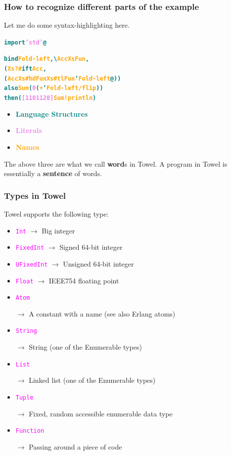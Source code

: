 \documentclass[10pt, compress, handout]{beamer}
\newcommand{\sst}[1]{\textcolor{teal}{\textbf{#1}}}
\newcommand{\ltt}[1]{\textcolor{violet}{\textbf{#1}}}
\newcommand{\nmt}[1]{\textcolor{orange}{\textbf{#1}}}
\begin{document}
\begin{frame}[fragile]
  \frametitle{How to recognize different parts of the example}

  Let me do some syntax-highlighting here.
  \begin{alltt}
  \sst{import} \ltt{'std'} \sst{@}

  \sst{bind} \nmt{Fold-left} \sst{,\textbackslash} \nmt{Acc} \nmt{Xs} \nmt{Fun}\sst{,}
    \sst{(}\nmt{Xs} \nmt{?#} \sst{ift} \nmt{Acc}\sst{,}
       \sst{(}\nmt{Acc} \nmt{Xs} \nmt{#hd} \nmt{Fun} \nmt{Xs} \nmt{#tl} \nmt{Fun}\sst{`} \nmt{Fold-left}\sst{@))}
  \sst{also} \nmt{Sum} \sst{(}\ltt{0} \sst{(}\nmt{+}\sst{`} \nmt{Fold-left} \nmt{/flip}\sst{))}
  \sst{then} \sst{(}\ltt{[1 10 11 20]} \nmt{Sum} \nmt{!println}\sst{)}
  \end{alltt}

  \begin{itemize}
  \item \sst{Language Structures}
  \item \ltt{Literals}
  \item \nmt{Names}
  \end{itemize}

The above three are what we call \textbf{word}s in Towel. A program in Towel is essentially a \textbf{sentence} of words.
\end{frame}


\newcommand{\tpt}[1]{\textcolor{magenta}{\texttt{#1}}}

\begin{frame}
  \frametitle{Types in Towel}

Towel supports the following type:
\pause
  \begin{itemize}
  \item<2-> \tpt{Int} $\rightarrow$ Big integer
  \item<2-> \tpt{FixedInt} $\rightarrow$ Signed 64-bit integer
  \item<2-> \tpt{UFixedInt} $\rightarrow$ Unsigned 64-bit integer
  \item<2-> \tpt{Float} $\rightarrow$ IEEE754 floating point
  \item<3-> \tpt{Atom}

    $\rightarrow$ A constant with a name (see also Erlang atoms)
  \item<4-> \tpt{String}

    $\rightarrow$ String (one of the Enumerable types)
  \item<4-> \tpt{List}

    $\rightarrow$ Linked list (one of the Enumerable types)
  \item<4-> \tpt{Tuple}

    $\rightarrow$ Fixed, random accessible enumerable data type
  \item<5-> \tpt{Function} 

    $\rightarrow$ Passing around a piece of code
  \end{itemize}
\end{frame}
\end{document}
